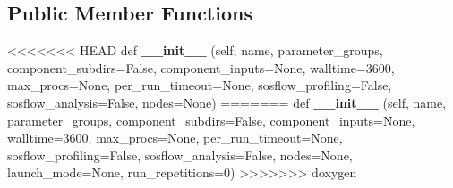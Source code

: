 \subsection*{Public Member Functions}
\begin{DoxyCompactItemize}
\item 
<<<<<<< HEAD
\mbox{\label{classcodar_1_1cheetah_1_1parameters_1_1_sweep_group_a811b57bffdfc485303eba98c45207c64}} 
def {\bfseries \+\_\+\+\_\+init\+\_\+\+\_\+} (self, name, parameter\+\_\+groups, component\+\_\+subdirs=False, component\+\_\+inputs=None, walltime=3600, max\+\_\+procs=None, per\+\_\+run\+\_\+timeout=None, sosflow\+\_\+profiling=False, sosflow\+\_\+analysis=False, nodes=None)
=======
\mbox{\label{classcodar_1_1cheetah_1_1parameters_1_1_sweep_group_ac736891b570edfa88bd8391ac82232c0}} 
def {\bfseries \+\_\+\+\_\+init\+\_\+\+\_\+} (self, name, parameter\+\_\+groups, component\+\_\+subdirs=False, component\+\_\+inputs=None, walltime=3600, max\+\_\+procs=None, per\+\_\+run\+\_\+timeout=None, sosflow\+\_\+profiling=False, sosflow\+\_\+analysis=False, nodes=None, launch\+\_\+mode=None, run\+\_\+repetitions=0)
>>>>>>> doxygen
\end{DoxyCompactItemize}
